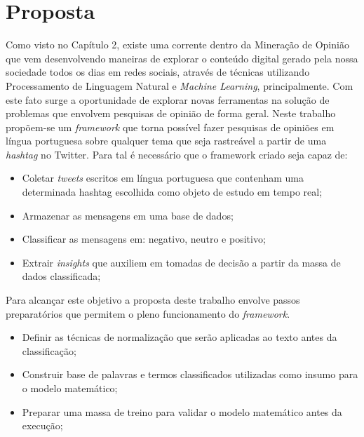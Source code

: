 \chapter{Proposta} \label{cap:proposta}

Como visto no Capítulo 2, existe uma corrente dentro da Mineração de Opinião que vem desenvolvendo maneiras de explorar o conteúdo digital gerado pela nossa sociedade todos os dias em redes sociais, através de técnicas utilizando Processamento de Linguagem Natural e \textit{Machine Learning}, principalmente. Com este fato surge a oportunidade de explorar novas ferramentas na
solução de problemas que envolvem pesquisas de opinião de forma geral.
Neste trabalho propõem-se um \textit{framework} que torna possível fazer pesquisas de opiniões em língua portuguesa sobre qualquer tema que seja rastreável a partir de uma \textit{hashtag} no Twitter.
Para tal é necessário que o framework criado seja capaz de:

\begin{itemize}
	\item Coletar \textit{tweets} escritos em língua portuguesa que contenham uma determinada {hashtag} escolhida como objeto de estudo em tempo real;
	\item Armazenar as mensagens em uma base de dados;
	\item Classificar as mensagens em: negativo, neutro e positivo;
	\item Extrair \textit{insights} que auxiliem em tomadas de decisão a partir da massa de dados classificada;
\end{itemize}

Para alcançar este objetivo a proposta deste trabalho envolve passos preparatórios que permitem o pleno funcionamento do \textit{framework}.

\begin{itemize}
	\item Definir as técnicas de normalização que serão aplicadas ao texto antes da classificação;
	\item Construir base de palavras e termos classificados utilizadas como insumo para o modelo matemático;
	\item Preparar uma massa de treino para validar o modelo matemático antes da execução;
\end{itemize}

